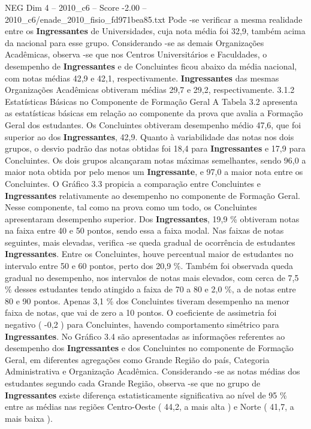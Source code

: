 \begin{textsample}{NEG Dim 4 – 2010\_c6 – Score -2.00 – 2010\_c6/enade\_2010\_fisio\_fd971bea85.txt}
Pode -se verificar a mesma realidade entre os \textbf{Ingressantes} de Universidades, cuja nota média foi 32,9, também acima da nacional para esse grupo.
Considerando -se as demais Organizações Acadêmicas, observa -se que nos Centros Universitários e Faculdades, o desempenho de \textbf{Ingressantes} e de Concluintes ficou abaixo da média nacional, com notas médias 42,9 e 42,1, respectivamente. \textbf{Ingressantes} das mesmas Organizações Acadêmicas obtiveram médias 29,7 e 29,2, respectivamente. 3.1.2 Estatísticas Básicas no Componente de Formação Geral A Tabela 3.2 apresenta as estatísticas básicas em relação ao componente da prova que avalia a Formação Geral dos estudantes.
Os Concluintes obtiveram desempenho médio 47,6, que foi superior ao dos \textbf{Ingressantes}, 42,9.
Quanto à variabilidade das notas nos dois grupos, o desvio padrão das notas obtidas foi 18,4 para \textbf{Ingressantes} e 17,9 para Concluintes.
Os dois grupos alcançaram notas máximas semelhantes, sendo 96,0 a maior nota obtida por pelo menos um \textbf{Ingressante}, e 97,0 a maior nota entre os Concluintes.
O Gráfico 3.3 propicia a comparação entre Concluintes e \textbf{Ingressantes} relativamente ao desempenho no componente de Formação Geral.
Nesse componente, tal como na prova como um todo, os Concluintes apresentaram desempenho superior.
Dos \textbf{Ingressantes}, 19,9 \% obtiveram notas na faixa entre 40 e 50 pontos, sendo essa a faixa modal.
Nas faixas de notas seguintes, mais elevadas, verifica -se queda gradual de ocorrência de estudantes \textbf{Ingressantes}.
Entre os Concluintes, houve percentual maior de estudantes no intervalo entre 50 e 60 pontos, perto dos 20,9 \%.
Também foi observada queda gradual no desempenho, nos intervalos de notas mais elevados, com cerca de 7,5 \% desses estudantes tendo atingido a faixa de 70 a 80 e 2,0 \%, a de notas entre 80 e 90 pontos.
Apenas 3,1 \% dos Concluintes tiveram desempenho na menor faixa de notas, que vai de zero a 10 pontos.
O coeficiente de assimetria foi negativo ( -0,2 ) para Concluintes, havendo comportamento simétrico para \textbf{Ingressantes}.
No Gráfico 3.4 são apresentadas as informações referentes ao desempenho dos \textbf{Ingressantes} e dos Concluintes no componente de Formação Geral, em diferentes agregações como Grande Região do país, Categoria Administrativa e Organização Acadêmica.
Considerando -se as notas médias dos estudantes segundo cada Grande Região, observa -se que no grupo de \textbf{Ingressantes} existe diferença estatisticamente significativa ao nível de 95 \% entre as médias nas regiões Centro-Oeste ( 44,2, a mais alta ) e Norte ( 41,7, a mais baixa ).

\end{textsample}
